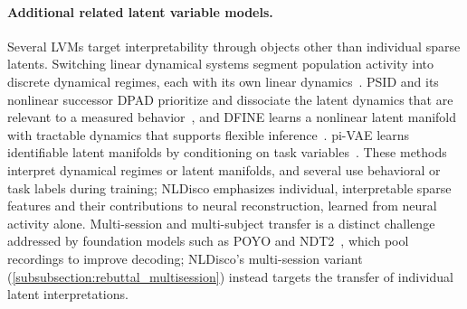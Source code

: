 \paragraph{Additional related latent variable models.}
\label{paragraph:rebuttal_related_work}
Several LVMs target interpretability through objects other than individual sparse latents. Switching linear dynamical systems segment population activity into discrete dynamical regimes, each with its own linear dynamics~\citep{linderman_2017_rslds}. PSID and its nonlinear successor DPAD prioritize and dissociate the latent dynamics that are relevant to a measured behavior~\citep{sani_2021_psid, sani_2024_dpad}, and DFINE learns a nonlinear latent manifold with tractable dynamics that supports flexible inference~\citep{abbaspourazad_2024_dfine}. pi-VAE learns identifiable latent manifolds by conditioning on task variables~\citep{zhou_2020_pivae}. These methods interpret dynamical regimes or latent manifolds, and several use behavioral or task labels during training; NLDisco emphasizes individual, interpretable sparse features and their contributions to neural reconstruction, learned from neural activity alone. Multi-session and multi-subject transfer is a distinct challenge addressed by foundation models such as POYO and NDT2~\citep{azabou_2023_unified, ye_2023_ndt2}, which pool recordings to improve decoding; NLDisco's multi-session variant (\hyperref[subsubsection:rebuttal_multisession]{\ref*{subsubsection:rebuttal_multisession}}) instead targets the transfer of individual latent interpretations.
